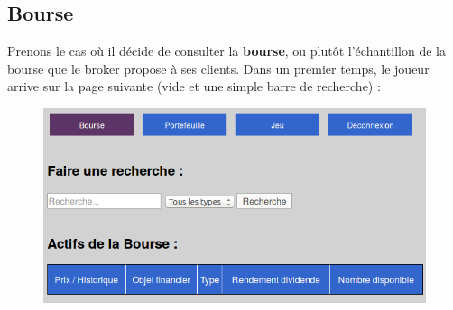    \newpage
    \subsection{Bourse}
    Prenons le cas où il décide de consulter la \textbf{bourse}, ou plutôt l'échantillon de la bourse que le broker propose à ses clients. Dans un premier temps, le joueur arrive sur la page suivante (vide et une simple barre de recherche) : 
    \begin{figure}[H]
      \center
      \includegraphics[scale=0.4]{../graph/5-accueilbourse.png}  
    \end{figure}
      
